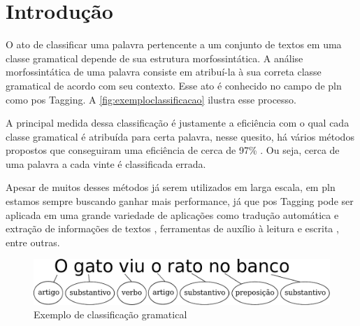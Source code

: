 \chapter{Introdução}\label{introducao}

O ato de classificar uma palavra pertencente a um conjunto de textos em uma classe gramatical depende de sua estrutura morfossintática. A análise morfossintática de uma palavra consiste em atribuí-la à sua correta classe gramatical de acordo com seu contexto. Esse ato é conhecido no campo de \ac{pln} como \ac{pos} Tagging. A \autoref{fig:exemploclassificacao} ilustra esse processo. 


A principal medida dessa classificação é justamente a eficiência com o qual cada classe gramatical é atribuída para certa palavra, nesse quesito, há vários métodos propostos que conseguiram uma eficiência de cerca de 97\% \cite{dos2014training, collobert2011deep, fonseca2015evaluating}. Ou seja, cerca de uma palavra a cada vinte é classificada errada. 

Apesar de muitos desses métodos já serem utilizados em larga escala, em \ac{pln} estamos sempre buscando ganhar mais performance, já que \ac{pos} Tagging pode ser aplicada em uma grande variedade de aplicações como tradução automática e extração de informações de textos \cite{manning1999foundations}, ferramentas de auxílio à leitura e escrita \cite{marquiafavel2010processo}, entre outras.

\begin{figure}[htb]
  \caption{Exemplo de classificação gramatical}\label{fig:exemploclassificacao}
  \begin{center}
      \includegraphics[scale=0.75]{img/exemploclassificacao.pdf}
  \end{center}
\end{figure}

